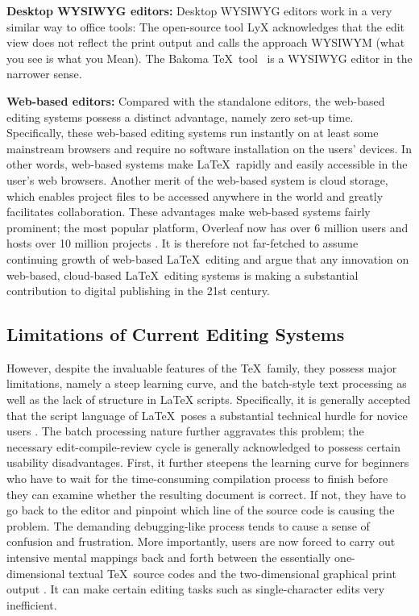 \documentclass[sigconf]{acmart}
\begin{document}
\textbf{Desktop WYSIWYG editors:}
Desktop WYSIWYG editors work in a very similar way to office tools: The open-source tool LyX \cite{kastrup2002revisiting} acknowledges that the edit view does not reflect the print output and calls the approach WYSIWYM (what you see is what you Mean).
The Bakoma \TeX\ tool~\cite{soft2011bakoma} is a WYSIWYG editor in the narrower sense. 

\textbf{Web-based editors:}
Compared with the standalone editors, the web-based editing systems possess a distinct advantage, namely zero set-up time. 
Specifically, these web-based editing systems run instantly on at least some mainstream browsers and require no software installation on the users' devices. 
In other words, web-based systems make \LaTeX\ rapidly and easily accessible in the user's web browsers.
Another merit of the web-based system is cloud storage, which enables project files to be accessed anywhere in the world and greatly facilitates collaboration. 
These advantages make web-based systems fairly prominent; the most popular platform, Overleaf now  has over 6 million users and hosts over 10 million projects \cite{overleafstat}. 
It is therefore not far-fetched to assume continuing growth of web-based \LaTeX\ editing and argue that any innovation on web-based, cloud-based \LaTeX\ editing systems is making a substantial contribution to digital publishing in the 21st century.

\subsection{Limitations of Current Editing Systems}
However, despite the invaluable features of the \TeX\ family, they possess major limitations, namely a steep learning curve, and the batch-style text processing as well as the lack of structure in LaTeX scripts.
Specifically, it is generally accepted that the script language of \LaTeX\  poses a substantial technical hurdle for novice users \cite{gratzer2008gentle}. 
The batch processing nature  further aggravates this problem; the necessary edit-compile-review cycle  is generally acknowledged to possess certain usability disadvantages.
First, it further steepens the learning curve for  beginners who have to wait for the time-consuming compilation process to finish before they can examine whether the resulting document is correct. 
If not, they have to go back to the editor and pinpoint which line of the source code is causing the problem. 
The demanding debugging-like process tends to cause a sense of confusion and frustration. 
More importantly, users are now forced to carry out intensive mental mappings back and forth between the essentially one-dimensional textual \TeX\ source codes and the two-dimensional graphical print output \cite{brown2013integrated}. 
It can make certain editing tasks such as single-character edits very inefficient. 
\end{document}
